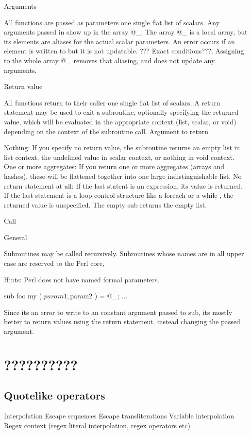 \documentclass{article}
\begin{document}
\begin{description}
Arguments 

All functions are passed as parameters one single flat list of
scalars. Any arguments passed in show up in the array @_. The array @_ is a
local array, but its elements are aliases for the actual scalar parameters. An
error occurs if an element is written to but it is not updatable. ??? Exact
conditions???. Assigning to the whole array @_ removes that aliasing, and does
not update any arguments.

Return value

All functions return to their caller one single flat list of scalars. A return
statement may be used to exit a subroutine, optionally specifying the returned
value, which will be evaluated in the appropriate context (list, scalar, or
void) depending on the context of the subroutine call.  Argument to return

Nothing: If you specify no return value, the subroutine returns an empty list in
list context, the undefined value in scalar context, or nothing in void context.
One or more aggregates: If you return one or more aggregates (arrays and
hashes), these will be flattened together into one large indistinguishable list.
No return statement at all: If the last statent is an expression, its value is
returned. If the last statement is a loop control structure like a foreach or a
while , the returned value is unspecified. The empty sub returns the empty list.

Call

General

Subroutines may be called recursively. Subroutines whose names are in all upper
case are reserved to the Perl core,

Hints:
Perl does not have named formal parameters.

sub foo {
  my ( $param1, $param2 ) = @_;
  ...
}

Since its an error to write to an constant argument passed to sub, its mostly
better to return values using the return statement, instead changing the passed
argument.

\section{??????????}

\subsection{Quotelike operators}

Interpolation
  Escape sequences
  Escape transliterations
  Variable interpolation
  Regex context (regex literal interpolation, regex operators etc)


\end{description}
\end{document}
